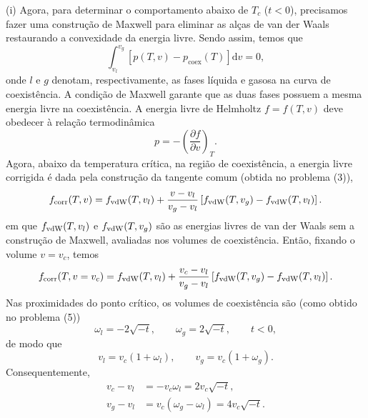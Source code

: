 \documentclass[11pt,a4paper]{article}
\newcommand{\pd}[2]{\frac{\partial #1}{\partial #2}}
\renewcommand{\dd}{\mathrm{d}}
\begin{document}
%
(i) Agora, para determinar o comportamento abaixo de $T_c$ ($t < 0$), precisamos fazer uma construção de Maxwell para eliminar as alças de van der Waals restaurando a convexidade da energia livre. Sendo assim, temos que
%
\begin{equation}
    \int_{v_l}^{v_g}
    \left[
    p(T,v)-p_{\mathrm{coex}}(T)
    \right]\dd v
    =
    0,
\end{equation}
%
onde $l$ e $g$ denotam, respectivamente, as fases líquida e gasosa na curva de coexistência. A condição de Maxwell garante que as duas fases possuem a mesma energia livre na coexistência. A energia livre de Helmholtz $f=f(T,v)$ deve obedecer à relação
termodinâmica
%
\begin{equation}
    p
    =
    -\left(\pd{f}{v}\right)_T.
    \label{eq:p_free_energy_cv}
\end{equation}
%
%
Agora, abaixo da temperatura crítica, na região de coexistência, a energia livre corrigida é dada pela construção da tangente comum (obtida no problema (3)),
%
\begin{equation}
    f_{\rm corr}(T,v)
    =
    f_{\rm vdW}(T,v_l)
    +
    \frac{v-v_l}{v_g-v_l}
    \left[
    f_{\rm vdW}(T,v_g)
    -
    f_{\rm vdW}(T,v_l)
    \right].
    \label{eq:maxwell_free_energy_cv}
\end{equation}
%
em que $f_{\rm vdW}(T,v_l)$ e $f_{\rm vdW}(T,v_g)$ são as energias livres de van der Waals sem a construção de Maxwell, avaliadas nos volumes de coexistência. Então, fixando o volume $v = v_c$, temos
%
\begin{equation}
    f_{\rm corr}(T,v=v_c)
    =
    f_{\rm vdW}(T,v_l)
    +
    \frac{v_c-v_l}{v_g-v_l}
    \left[
    f_{\rm vdW}(T,v_g)
    -
    f_{\rm vdW}(T,v_l)
    \right].
    \label{eq:maxwell_free_energy_cv_critical}
\end{equation}
%
Nas proximidades do ponto crítico, os volumes de coexistência são (como obtido no problema (5))
%
\begin{equation}
    \omega_l=-2\sqrt{-t},
    \qquad
    \omega_g=2\sqrt{-t},
    \qquad
    t<0,
\end{equation}
%
de modo que
%
\begin{equation}
    v_l=v_c(1+\omega_l),
    \qquad
    v_g=v_c(1+\omega_g).
\end{equation}
%
Consequentemente,
%
\begin{align}
    v_c-v_l
    &=
    -v_c\omega_l
    =
    2v_c\sqrt{-t},
    \\
    v_g-v_l
    &=
    v_c(\omega_g-\omega_l)
    =
    4v_c\sqrt{-t}.
\end{align}
\end{document}
